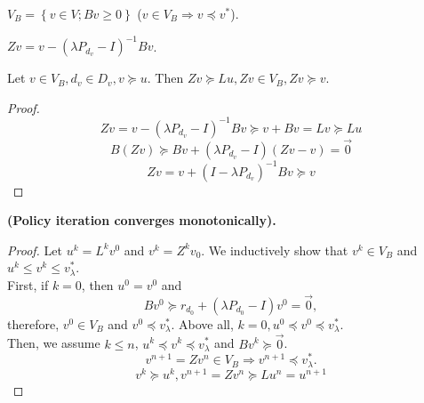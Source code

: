 \begin{definition}
    $ V_B = \left\{ v \in V; Bv \ge 0 \right\} $ ($ v \in V_B \Rightarrow v \preceq v^*$).
\end{definition}
\begin{definition}
    $ Zv = v - {(\lambda P _{d_{v}} - I) }^{-1} B v $.
\end{definition}
\begin{lemma}
    Let $ v \in V_B, d_v \in D_v, v \succeq u $. Then $ Zv \succeq L u, Zv \in V_B, Zv \succeq v$.
    \begin{proof}
        \[
           Zv = v - {(\lambda P _{d_{v}} - I) }^{-1} B v \succeq v + Bv = Lv \succeq L u   
        \]
        \[
            B(Zv) \succeq Bv + (\lambda P_{d_{v}} - I) (Zv - v) = \vec{0}
        \]
        \[
            Zv = v + {(I - \lambda P _{d_{v}}) }^{-1} B v \succeq v 
        \]
    \end{proof}
\end{lemma}
\begin{theorem}
    \textbf{(Policy iteration converges monotonically).}
    \begin{proof}
        Let $ u^k = L^k v^0 $ and $ v^k = Z^k v_0 $. We inductively show that $ v^k \in V_B $ and $ u^k \le v^k \le v^*_\lambda $.\\
        First, if $k = 0$, then $ u^0 = v^0 $ and
        \[
            Bv^0 \succeq r_{d_{0}} + (\lambda P_{d_0} - I) v^0 = \vec{0},
        \]
        therefore, $ v^0 \in V_B $ and $ v^0 \preceq v^*_{\lambda} $. Above all, $ k = 0, u^0 \preceq v^0 \preceq v^*_{\lambda} $.\\
        Then, we assume $ k \le n $, $ u^k \preceq v^k \preceq v^*_{\lambda} $ and $ B v^k \succeq \vec{0} $.
        \[
            v^{n+1} = Z v^n \in V_B \Rightarrow v^{n+1} \preceq v^*_{\lambda}.
        \]
        \[
            v^k \succeq u^k, v^{n+1} = Z v^n \succeq L u^n = u^{n+1}
        \]
    \end{proof}
\end{theorem}

